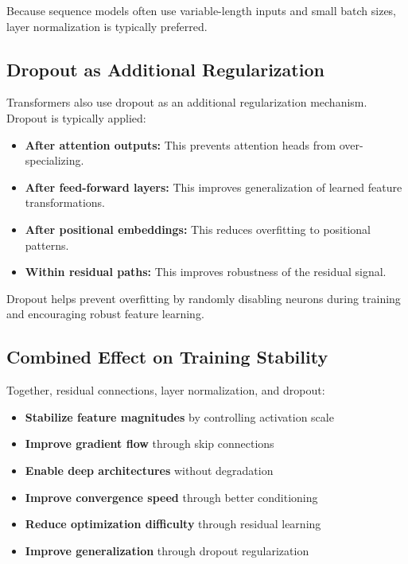 \documentclass[11pt]{article}
\begin{document}
Because sequence models often use variable-length inputs and small batch sizes, layer normalization is typically preferred.

\subsection{Dropout as Additional Regularization}

Transformers also use dropout as an additional regularization mechanism. Dropout is typically applied:

\begin{itemize}

\item \textbf{After attention outputs:}  
This prevents attention heads from over-specializing.

\item \textbf{After feed-forward layers:}  
This improves generalization of learned feature transformations.

\item \textbf{After positional embeddings:}  
This reduces overfitting to positional patterns.

\item \textbf{Within residual paths:}  
This improves robustness of the residual signal.

\end{itemize}

Dropout helps prevent overfitting by randomly disabling neurons during training and encouraging robust feature learning.

\subsection{Combined Effect on Training Stability}

Together, residual connections, layer normalization, and dropout:

\begin{itemize}

\item \textbf{Stabilize feature magnitudes} by controlling activation scale
\item \textbf{Improve gradient flow} through skip connections
\item \textbf{Enable deep architectures} without degradation
\item \textbf{Improve convergence speed} through better conditioning
\item \textbf{Reduce optimization difficulty} through residual learning
\item \textbf{Improve generalization} through dropout regularization

\end{itemize}
\end{document}
